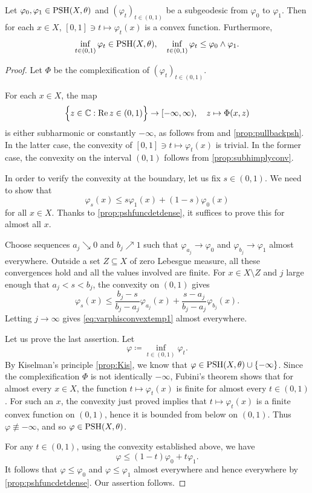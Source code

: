 \begin{proposition}\label{prop:convexsubgeod}
    Let $\varphi_0,\varphi_1\in \mathrm{PSH}(X,\theta)$ and $(\varphi_t)_{t\in (0,1)}$ be a subgeodesic from $\varphi_0$ to $\varphi_1$. Then for each $x\in X$, $[0,1] \ni t\mapsto \varphi_t(x)$ is a convex function. Furthermore,
    \[
    \inf_{t\in (0,1)}\varphi_t\in \mathrm{PSH}(X,\theta),\quad \inf_{t\in (0,1)}\varphi_t\leq \varphi_0\land \varphi_1.
    \]
\end{proposition}


\begin{proof}
    Let $\Phi$ be the complexification of $(\varphi_t)_{t\in (0,1)}$.

    For each $x\in X$, the map
    \[
    \Bigl\{z\in \mathbb{C}: \operatorname{Re} z\in (0,1) \Bigr\}\rightarrow [-\infty,\infty),\quad z\mapsto \Phi(x,z)
    \]
    is either subharmonic or constantly $-\infty$, as follows from  and \cref{prop:pullbackpsh}.
    In the latter case, the convexity of $[0,1] \ni t\mapsto \varphi_t(x)$ is trivial. In the former case, the convexity on the interval $(0,1)$ follows from
    \cref{prop:subhimplyconv}.

    In order to verify the convexity at the boundary, let us fix $s\in (0,1)$. We need to show that
    \begin{equation}\label{eq:varphisconvextemp1}
    \varphi_s(x)\leq s\varphi_1(x)+(1-s)\varphi_0(x)
    \end{equation}
    for all $x\in X$. Thanks to \cref{prop:pshfuncdetdense}, it suffices to prove this for almost all $x$.

    Choose sequences $a_j\searrow0$ and $b_j\nearrow1$ such that $\varphi_{a_j}\to\varphi_0$ and $\varphi_{b_j}\to\varphi_1$ almost everywhere. Outside a set $Z\subseteq X$ of zero Lebesgue measure, all these convergences hold and all the values involved are finite. For $x\in X\setminus Z$ and $j$ large enough that $a_j<s<b_j$, the convexity on $(0,1)$ gives
    \[
    \varphi_s(x)\leq \frac{b_j-s}{b_j-a_j}\varphi_{a_j}(x)+\frac{s-a_j}{b_j-a_j}\varphi_{b_j}(x).
    \]
    Letting $j\to\infty$ gives \eqref{eq:varphisconvextemp1} almost everywhere.

    Let us prove the last assertion. Let
    \[
    \varphi\coloneqq \inf_{t\in (0,1)}\varphi_t.
    \]
    By Kiselman's principle \cref{prop:Kis}, we know that $\varphi\in \mathrm{PSH}(X,\theta)\cup \{-\infty\}$. Since the complexification $\Phi$ is not identically $-\infty$, Fubini's theorem shows that for almost every $x\in X$, the function $t\mapsto \varphi_t(x)$ is finite for almost every $t\in (0,1)$. For such an $x$, the convexity just proved implies that $t\mapsto \varphi_t(x)$ is a finite convex function on $(0,1)$, hence it is bounded from below on $(0,1)$. Thus $\varphi\not\equiv -\infty$, and so $\varphi\in \mathrm{PSH}(X,\theta)$.

    For any $t\in (0,1)$, using the convexity established above, we have
    \[
    \varphi\leq (1-t)\varphi_0+t\varphi_1.
    \]
    It follows that $\varphi\leq \varphi_0$ and $\varphi\leq \varphi_1$ almost everywhere and hence everywhere by \cref{prop:pshfuncdetdense}. Our assertion follows.
\end{proof}

